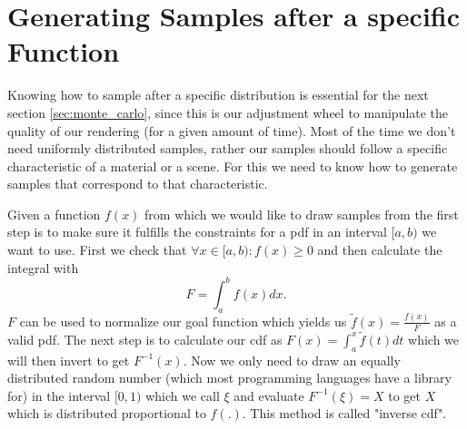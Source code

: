 \section{Generating Samples after a specific Function}
\label{sec:sample_generation}
Knowing how to sample after a specific distribution is essential for the next section \ref{sec:monte_carlo},
since this is our adjustment wheel to manipulate the quality of our rendering (for a given amount of time).
Most of the time we don't need uniformly distributed samples,
rather our samples should follow a specific characteristic of a material or a scene.
For this we need to know how to generate samples that correspond to that characteristic.

Given a function $ f(x) $ from which we would like to draw samples from the first step is to make sure
it fulfills the constraints for a pdf in an interval $ [a, b) $ we want to use.
First we check that $ \forall x \in [a, b): f(x) \geq 0 $ and then calculate the integral with
\begin{equation}
\label{eq:integral_fx}
    F = \int_{a}^b f(x) dx.
\end{equation}
$ F $ can be used to normalize our goal function which yields us $ \tilde{f}(x) = \frac{f(x)}{F} $ as a valid pdf.
The next step is to calculate our cdf as $ F(x) = \int_{a}^x \tilde{f}(t) dt $ which we will then invert to get $ F^{-1}(x) $.
Now we only need to draw an equally distributed random number (which most programming languages have a library for) in the interval $ [0, 1) $
which we call $ \xi $ and evaluate $ F^{-1}(\xi) = X $ to get $ X $ which is distributed proportional to $ f(.) $.
This method is called "inverse cdf".



